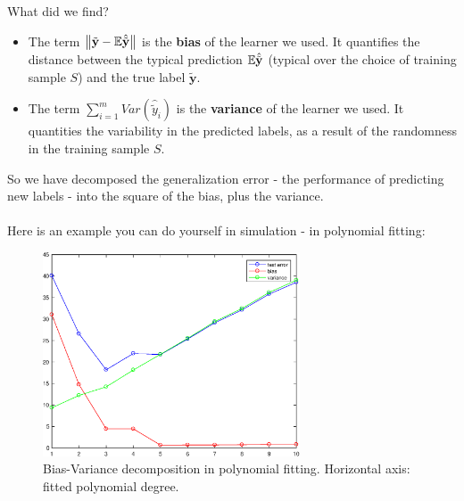 \documentclass[11pt]{article}
\newcommand{\norm}[1]{\left\| #1\right\|}
\newcommand{\V}[1]{\mathbf{#1}}
\begin{document}
       What did we find?
       \begin{itemize}
         \item The term $\norm{\tilde{\V{y}}-\E\hat{\tilde{\V{y}}} }$ is the
           {\bf bias} of the learner we used. It quantifies the distance between
           the typical prediction $\E\hat{\tilde{\V{y}}}$ (typical over the choice of
           training sample $S$) and the true label
           $\tilde{\V{y}}$.
         \item The term $\sum_{i=1}^m Var(\hat{\tilde{y}}_i)$ is the {\bf
           variance} of the learner we used. It quantities the variability in
           the predicted labels,  as a result of the randomness in the training
           sample $S$.

       \end{itemize}

       So we have decomposed the generalization error - the performance of
       predicting new labels - into 
       the square of the bias, plus the variance.
\\~\\
       Here is an example you can do yourself in simulation - in polynomial
       fitting:


\begin{figure}[H]
  \centering
  \includegraphics[width=3in]{poly_bias_variance.eps}
  \caption{Bias-Variance decomposition in polynomial fitting. Horizontal axis:
  fitted polynomial degree.}
\end{figure}
\end{document}
